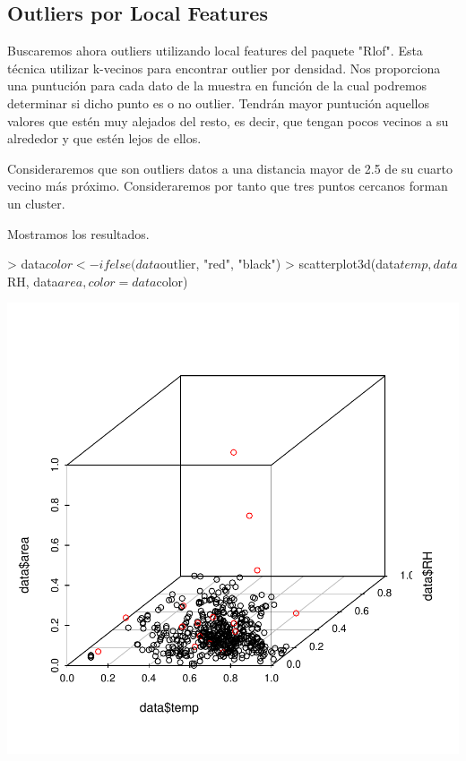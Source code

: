 \documentclass [a4paper] {article}
\begin{document}
\subsection{Outliers por Local Features}
Buscaremos ahora outliers utilizando local features del paquete "Rlof".
Esta técnica utilizar k-vecinos para encontrar outlier por densidad.
Nos proporciona una puntución para cada dato de la muestra en función de la cual podremos determinar si dicho punto es o no outlier.
Tendrán mayor puntución aquellos valores que estén muy alejados del resto, es decir, que tengan pocos vecinos a su alrededor y que estén lejos de ellos.

Consideraremos que son outliers datos a una distancia mayor de 2.5 de su cuarto vecino más próximo.
Consideraremos por tanto que tres puntos cercanos forman un cluster.
\begin{Schunk}
\end{Schunk}

Mostramos los resultados.
\begin{center}
\begin{Schunk}
\begin{Sinput}
> data$color <- ifelse(data$outlier, "red", "black")
> scatterplot3d(data$temp, data$RH, data$area, color = data$color)
\end{Sinput}
\end{Schunk}
\includegraphics{entrega-display}
\end{center}
\end{document}
